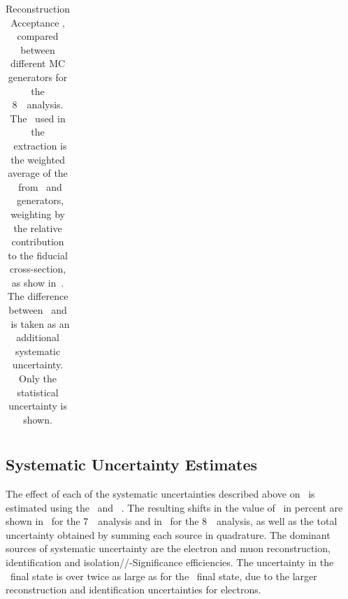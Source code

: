 \begin{table}[htbp]
\begin{tabular}{l c c c c}


    \end{tabular}
    \caption[Reconstruction Acceptance \CZZ, compared between different MC
    generators for the 8~\tev\ analysis.]{Reconstruction Acceptance \CZZ, compared between different MC
    generators for the 8~\tev\ analysis. The \CZZ\ used in the \cx\ extraction is the
    weighted average of the \CZZ\ from \powhegbox\ and \ggtwoZZ\ generators, weighting
    by the relative contribution to the fiducial cross-section, as show in~.
    The difference between \powhegbox\ and \sherpa\ is taken as an additional
    systematic uncertainty.
    Only the statistical uncertainty is shown. 
    }
    \label{table:objSel-syst-genComp-eight}
\end{table}

\subsection{Systematic Uncertainty Estimates}
\label{sec:systematic-estimate-tables}

The effect of each of the systematic uncertainties described above on \CZZ\ is estimated using
the \powhegbox\ and \ggZZ\ \mc. The resulting shifts in the value of \CZZ\ in
percent are shown in~ for the 7~\tev\ analysis and
in~ for the 8~\tev\ analysis, as well as the total
uncertainty obtained by summing each source in quadrature. The
dominant sources of systematic uncertainty are the electron and muon reconstruction,
identification and isolation/\zzero/\dzero-Significance efficiencies. The
uncertainty in the \eeee\ final state is over twice as large as for the \mmmm\
final state, due to the larger reconstruction and identification uncertainties
for electrons.


